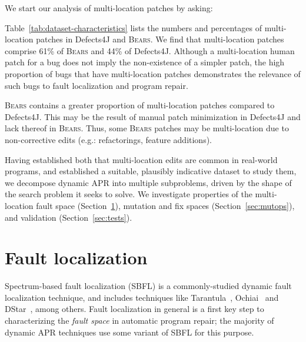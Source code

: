 \documentclass[10pt, conference]{IEEEtran}
\newcommand\bears{\textsc{Bears}\xspace}
\begin{document}
We start our analysis of multi-location patches by asking:

Table~\ref{tab:dataset-characteristics} lists the numbers and percentages of
multi-location patches in Defects4J and \bears. 
We find that multi-location patches comprise 61\% of \bears and 44\% of Defects4J.
Although a multi-location human patch for a bug does not imply the 
non-existence of a simpler patch, the high proportion of bugs that have 
multi-location patches demonstrates the relevance of such bugs to fault localization and
program repair. 

\bears contains a greater proportion of 
multi-location patches compared to Defects4J. This may be the 
result of manual patch minimization in Defects4J
and lack thereof in \bears.
Thus, some \bears patches may be multi-location due to
non-corrective edits (e.g.: refactorings, feature additions).

Having established both that multi-location edits are common in real-world
programs, and established a suitable, plausibly indicative dataset to study
them, we decompose dynamic APR into multiple subproblems, driven by the
shape of the search problem it seeks to solve. We 
investigate properties of the multi-location fault space (Section~\ref{secFL}),
mutation and fix spaces (Section~\ref{sec:mutops}), and validation
(Section~\ref{sec:tests}). 

\section{Fault localization} \label{secFL}


Spectrum-based fault localization (SBFL) is a commonly-studied dynamic
fault localization technique, and includes techniques like Tarantula~\cite{tarantula},
Ochiai~\cite{ochiai} and DStar~\cite{wong2013dstar}, among others.
Fault localization in general is a first key step to characterizing the
\emph{fault space} in automatic program repair; the majority of dynamic APR
techniques use some variant of SBFL for this purpose.
\end{document}
